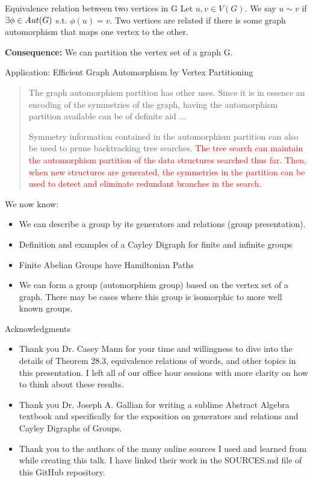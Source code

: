 \documentclass{beamer}
\begin{document}
\begin{frame}{Equivalence relation between two vertices in G}
Let $u, v \in V(G)$. We say $u \sim v$ if $\exists \space \phi \in Aut(G)$ s.t. $\phi(u) = v$. Two vertices are related if there is some graph automorphism that maps one vertex to the other. \pause

\textbf{Consequence:} We can partition the vertex set of a graph G. \smallskip
\pause

\begin{block}{Application: Efficient Graph Automorphism by Vertex Partitioning}
\begin{quote}
The graph automorphism partition has other uses. Since it is in essence an
encoding of the symmetries of the graph, having the automorphism partition
available can be of definite aid ...

Symmetry information contained in the automorphism partition can also be
used to prune backtracking tree searches.
\textcolor{red}{The tree search can maintain the
automorphism partition of the data structures searched thus far. Then, when
new structures are generated, the symmetries in the partition can be used to
detect and eliminate redundant branches in the search.}
\end{quote}
\end{block}
\end{frame}

\begin{frame}{We now know:}
    \begin{itemize}
        \item<1-> We can describe a group by its generators and relations (group presentation).
        \item<2-> Definition and examples of a Cayley Digraph for finite and infinite groups
        \item<3-> Finite Abelian Groups have Hamiltonian Paths
        \item<4-> We can form a group (automorphism group) based on the vertex set of a graph. There may be cases where this group is isomorphic to more well known groups.
    \end{itemize}
\end{frame}

\begin{frame}{Acknowledgments}
    \begin{itemize}
        \item Thank you Dr. Casey Mann for your time and willingness to dive into the details of Theorem 28.3, equivalence relations of words, and other topics in this presentation. I left all of our office hour sessions with more clarity on how to think about these results.
        \item Thank you Dr. Joseph A. Gallian for writing a sublime Abstract Algebra textbook and specifically for the exposition on generators and relations and Cayley Digraphs of Groups.
        \item Thank you to the authors of the many online sources I used and learned from while creating this talk. I have linked their work in the SOURCES.md file of this GitHub repository.
    \end{itemize}
\end{frame}
\end{document}
